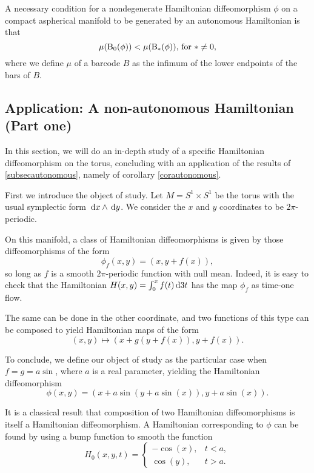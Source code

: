 \begin{corollary}\label{corautonomous}
A necessary condition for a nondegenerate Hamiltonian diffeomorphism $\phi$ on a compact aspherical manifold to be generated by an autonomous Hamiltonian is that
\begin{equation}
\mu(\mathrm{B}_0(\phi)) < \mu(\mathrm{B}_*(\phi))\text{, for $* \neq 0$,}
\end{equation}
where we define $\mu$ of a barcode $B$ as the infimum of the lower endpoints of the bars of $B$.
\end{corollary}


\subsection{Application: A non-autonomous Hamiltonian (Part one)}

In this section, we will do an in-depth study of a specific Hamiltonian diffeomorphism on the torus, concluding with an application of the results of \ref{subsecautonomous}, namely of corollary \ref{corautonomous}.

First we introduce the object of study. Let $M = S^1 \times S^1$ be the torus with the usual symplectic form $\dl x \wedge \dl y$. We consider the $x$ and $y$ coordinates to be $2\pi$-periodic.

On this manifold, a class of Hamiltonian diffeomorphisms is given by those diffeomorphisms of the form
\begin{equation}
\phi_f(x,y) = (x, y + f(x)),
\end{equation}
so long as $f$ is a smooth $2\pi$-periodic function with null mean. Indeed, it is easy to check that the Hamiltonian $H(x,y) = \int_0^x f(t) \dl3 t$ has the map $\phi_f$ as time-one flow.

The same can be done in the other coordinate, and two functions of this type can be composed to yield Hamiltonian maps of the form
\begin{equation}
(x,y) \mapsto (x + g(y+f(x)), y+f(x)).
\end{equation}

To conclude, we define our object of study as the particular case when $f = g = a \sin$, where $a$ is a real parameter, yielding the Hamiltonian diffeomorphism
\begin{equation}
\phi(x,y) = ( x + a \sin(y + a \sin(x)), y + a \sin(x)).
\end{equation}

It is a classical result that composition of two Hamiltonian diffeomorphisms is itself a Hamiltonian diffeomorphism. A Hamiltonian corresponding to $\phi$ can be found by using a bump function to smooth the function
\begin{equation}
H_0(x,y,t) = \begin{cases}
-\cos(x), & t < a,\\
\cos(y), & t > a.
\end{cases}
\end{equation}

